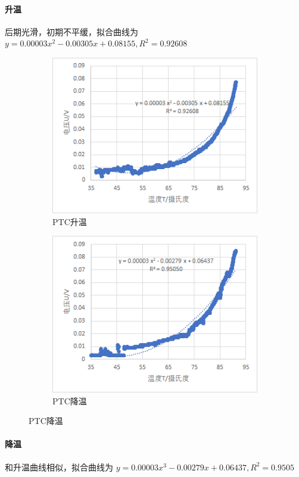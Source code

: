 \documentclass[a4paper]{../phyreport}
\begin{document}
\paragraph{升温}后期光滑，初期不平缓，拟合曲线为 $y=0.00003x^2-0.00305x+0.08155,R^2=0.92608$ 
\begin{figure}[H]
\centering
\begin{subfigure}{.5\textwidth}
\includegraphics[width=.8\linewidth]{测量水比热/20240508111016.png}
\caption{\label{fig:pnup} PTC升温}
\end{subfigure}\hfil
\begin{subfigure}{.5\textwidth}
\includegraphics[width=.8\linewidth]{测量水比热/20240508111036.png}
\caption{\label{fig:pndn} PTC降温}
\end{subfigure}
\end{figure}
\paragraph{降温}和升温曲线相似，拟合曲线为 $y=0.00003x^3-0.00279x+0.06437,R^2=0.9505$ 
\end{document}
